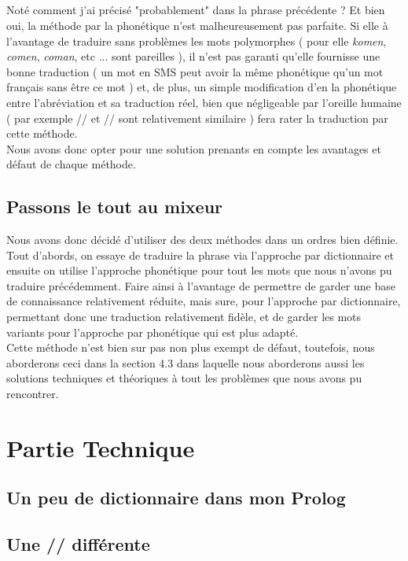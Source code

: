 \documentclass[11pt]{book}
\begin{document}
	\paragraph{} Noté comment j'ai précisé "probablement" dans la phrase précédente ? Et bien oui, la méthode par la phonétique n'est malheureusement pas parfaite. Si elle à l'avantage de traduire sans problèmes les mots polymorphes ( pour elle {\em komen}, {\em comen}, {\em coman}, etc ... sont pareilles ), il n'est pas garanti qu'elle fournisse une bonne traduction ( un mot en SMS peut avoir la même phonétique qu'un mot français sans être ce mot ) et, de plus, un simple modification d'en la phonétique entre l'abréviation et sa traduction réel, bien que négligeable par l'oreille humaine ( par exemple // et // sont relativement similaire ) fera rater la traduction par cette méthode.\\
	Nous avons donc opter pour une solution prenants en compte les avantages et défaut de chaque méthode.
	
	\section{Passons le tout au mixeur}
	Nous avons donc décidé d'utiliser des deux méthodes dans un ordres bien définie. Tout d'abords, on essaye de traduire la phrase via l'approche par dictionnaire et ensuite on utilise l'approche phonétique pour tout les mots que nous n'avons pu traduire précédemment. Faire ainsi à l'avantage de permettre de garder une base de connaissance relativement réduite, mais sure, pour l'approche par dictionnaire, permettant donc une traduction relativement fidèle, et de garder les mots variants pour l'approche par phonétique qui est plus adapté.\\
	Cette méthode n'est bien sur pas non plus exempt de défaut, toutefois, nous aborderons ceci dans la section 4.3 dans laquelle nous aborderons aussi les solutions techniques et théoriques à tout les problèmes que nous avons pu rencontrer.

\chapter{Partie Technique}
	\section{Un peu de dictionnaire dans mon Prolog}
	
	\section{Une // différente}
	
\end{document}
